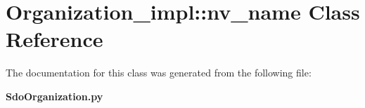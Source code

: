 \section{Organization\_\-impl::nv\_\-name Class Reference}
\label{classOrganization__impl_1_1nv__name}


The documentation for this class was generated from the following file:\begin{CompactItemize}
\item 
{\bf Sdo\-Organization.py}\end{CompactItemize}
